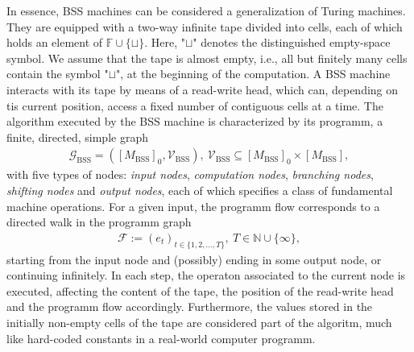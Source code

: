 \documentclass[conference]{IEEEtran}
\def\G{{\mathcal G}}
\def\V{{\mathcal V}}
\def\F{{\mathcal F}}
\def\NN{{\mathbb N}}
\def\FF{{\mathbb F}}
\newcommand{\BSS}{\mathrm{BSS}}
\begin{document}
	In essence, BSS machines can be considered a generalization of Turing machines. They are equipped with a two-way infinite tape divided into cells, each of which holds an 
	element of \(\FF\cup\{\sqcup\}\). Here, "\(\sqcup\)" denotes the distinguished empty-space symbol. We assume that the tape is almost empty, i.e., all but finitely many cells 
	contain the symbol "\(\sqcup\)", at the beginning of the computation. A BSS machine interacts with its tape by means of a read-write head, which can, depending on tis current 
	position, access a fixed number of contiguous cells at a time. The algorithm executed by the BSS machine is characterized by its programm, a finite, directed, simple graph 
	\begin{align*}   \G_\BSS = ([M_\BSS]_{0}, \V_\BSS),~ \V_\BSS \subseteq [M_\BSS]_{0} \times [M_\BSS],
	\end{align*} 
	with five types of nodes: \emph{input nodes}, \emph{computation nodes}, \emph{branching nodes}, \emph{shifting nodes} and \emph{output nodes}, each of which specifies a class 
	of fundamental machine operations. For a given input, the programm flow corresponds to a directed walk in the programm graph
	\begin{align*}	\F := (e_t)_{t\in\{1,2,\ldots,T\}},~T\in\NN\cup \{\infty\},
	\end{align*}
	starting from the input node and (possibly) ending in some output node, or continuing infinitely. In each step, the operaton associated to the current node is executed, 
	affecting the content of the tape, the position of the read-write head and the programm flow accordingly. Furthermore, the values stored in the initially non-empty cells 
	of the tape are considered part of the algoritm, much like hard-coded constants in a real-world computer programm. 
\end{document}
